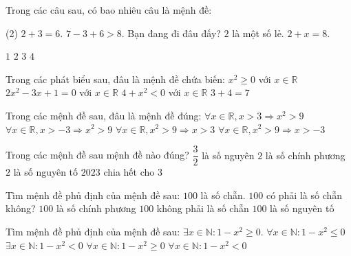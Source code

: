 \begin{ex}
	Trong các câu sau, có bao nhiêu câu là mệnh đề:
    \begin{tasks}(2)
        \task $2+3=6$.
        \task $7-3+6>8$.
        \task Bạn đang đi đâu đấy?
        \task $2$ là một số lẻ.
        \task $2+x=8$.
    \end{tasks}
	
	\choice
	{$1$}
	{$2$}
	{\True $3$}
	{$4$}
\end{ex}
\begin{ex}
	Trong các phát biểu sau, đâu là mệnh đề chứa biến:
	\choice
	{$x^2 \ge 0$ với $x\in \mathbb{R}$}
	{\True $2x^2-3x+1=0$ với $x\in \mathbb{R}$}
	{$4+x^2<0$ với $x\in \mathbb{R}$}
	{$3+4=7$}
\end{ex}
\begin{ex}
	Trong các mệnh đề sau, đâu là mệnh đề đúng:
	\choice
	{\True $\forall x\in \mathbb{R},x>3\Rightarrow x^2>9$}
	{$\forall x\in \mathbb{R},x> -3\Rightarrow x^2>9$}
	{$\forall x\in \mathbb{R},x^2>9\Rightarrow x>3$}
	{$\forall x\in \mathbb{R},x^2>9\Rightarrow x>-3$}
\end{ex}
\begin{ex}
	Trong các mệnh đề sau mệnh đề nào đúng?
	\choice
	{$\dfrac{3}{2}$ là số nguyên}
	{$2$ là số chính phương}
	{\True $2$ là số nguyên tố}
	{$2023$ chia hết cho $3$}
\end{ex}
\begin{ex}
	Tìm mệnh đề phủ định của mệnh đề sau: $100$ là số chẵn.
	\choice
	{$100$ có phải là số chẵn không?}
	{$100$ là số chính phương}
	{\True $100$ không phải là số chẵn}
	{$100$ là số nguyên tố}
\end{ex}
\begin{ex}
	Tìm mệnh đề phủ định của mệnh đề sau: $\exists x\in \mathbb{N}\colon 1-x^2\ge 0$.
	\choice
	{$\forall x\in \mathbb{N}\colon 1-x^2\le 0$}
	{$\exists x\in \mathbb{N}\colon 1-x^2<0$}
	{$\forall x\in \mathbb{N}\colon 1-x^2\ge 0$}
	{\True $\forall x\in \mathbb{N}\colon 1-x^2<0$}
\end{ex}
